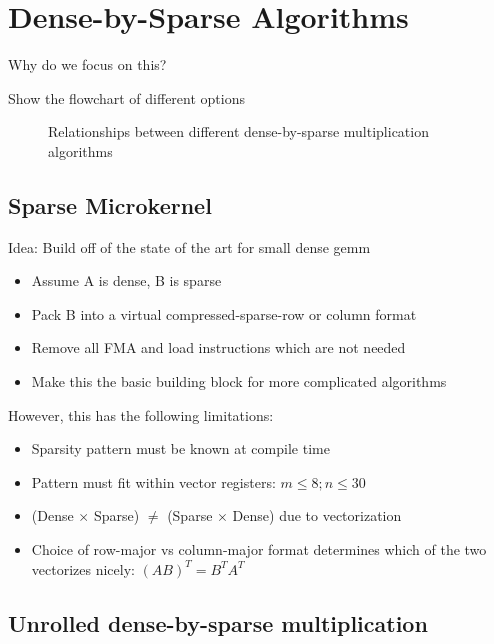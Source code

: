 \chapter{Dense-by-Sparse Algorithms}
\label{chapter:algs}

Why do we focus on this? 

Show the flowchart of different options

\begin{figure}[H]
  \centering
  
  \label{fig:dxspfamilies}
  \caption{Relationships between different dense-by-sparse multiplication algorithms}
\end{figure}


\section{Sparse Microkernel}
Idea: Build off of the state of the art for small dense gemm
\begin{itemize}
    \item Assume A is dense, B is sparse
    \item Pack B into a virtual compressed-sparse-row or column format
    \item Remove all FMA and load instructions which are not needed
    \item Make this the basic building block for more complicated algorithms 
\end{itemize}

However, this has the following limitations:
\begin{itemize}
    \item Sparsity pattern must be known at compile time
    \item Pattern must fit within vector registers: $m \leq 8;  n \leq 30$
    \item (Dense $\times$ Sparse) $\neq$ (Sparse $\times$ Dense) due to vectorization
    \item Choice of row-major vs column-major format determines which of the two vectorizes nicely: $(AB)^T = B^T A^T$
\end{itemize}

\section{Unrolled dense-by-sparse multiplication}

